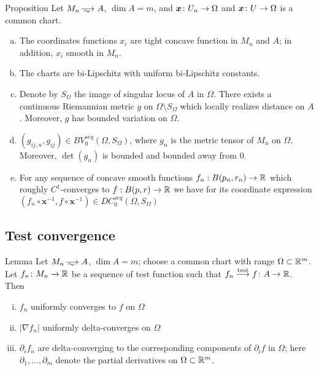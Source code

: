 \begin{thm}{ Proposition}\label{Prop:chart}
Let $M_n\smooths{} A$, $\dim A=m$, and
$\bm{x}\: U_n\zz\to \Omega$ and $\bm{x}\: U\zz\to \Omega$ is a common chart.

\begin{enumerate}[(a)]

\item\label{obtuse}
The coordinates functions $x_i$ are tight concave function in $M_n$ and $A$;
in addition, $x_i$ smooth in $M_n$.

\item The charts are bi-Lipschitz  with uniform  bi-Lipschitz 
constants.

\item\label{metric} 
Denote by $S_\Omega$ the image of singular locus of $A$ in $\Omega$.
There exists a continuous Riemannian metric
$g$ on $\Omega\setminus S_\Omega$ which locally 
realizes distance on $A$.
Moreover, $g$ has bounded variation
on $\Omega$. 

\item\label{metricseq}
$(g_{ij,n}, g_{ij})\in BV_0^{seq}(\Omega, S_\Omega)$, where $g_n$ is the metric tensor of $M_n$ on $\Omega$.
Moreover, $\det(g_n)$ is bounded and bounded away from 0.


\item\label{funktioninchart}
For any
sequence
of concave smooth functions
$f_n:B(p_n,r_n)\to\mathbb{R}$ 
which roughly $C^1$-converges to  $f:B(p,r)\to\mathbb{R}$ we have for its coordinate
expression
$(f_n\circ\bm{x}^{-1}, f\circ\bm{x}^{-1})\in DC_0^{seq}(\Omega, S_\Omega)$

\end{enumerate}
\end{thm}

\subsection{Test convergence}

\begin{thm}{Lemma}\label{lem:test-delta}
Let $M_n\smooths{} A$, $\dim A=m$;
choose a common chart with range $\Omega\subset \mathbb{R}^m$.
Let $f_n\colon M_n\to\mathbb{R}$ be a sequence of test function such that $f_n\stackrel{\tiny\rm test}{\longrightarrow} f\colon A\to \mathbb{R}$.
Then 
\begin{enumerate}[(i)]
\item\label{lem:test-delta-f} $f_n$ uniformly converges to $f$ on $\Omega$
\item\label{lem:test-delta|nabla|} $|\nabla f_n|$ uniformly delta-converges on $\Omega$
\item\label{lem:test-delta-partial} $\partial_if_n$ are delta-converging to the corresponding components of $\partial_i f$ in $\Omega$;
here $\partial_1,\dots,\partial_m$ denote the partial derivatives on $\Omega\subset \mathbb{R}^m$.
\end{enumerate}

\end{thm}

